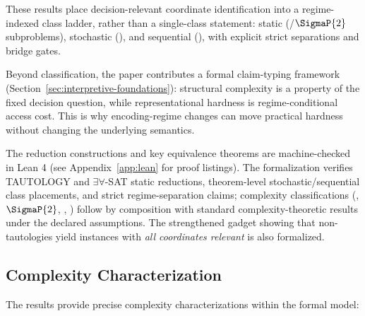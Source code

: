 These results place decision-relevant coordinate identification into a regime-indexed class ladder, rather than a single-class statement: static (\coNP/\(\SigmaP{2}\) subproblems), stochastic (\PP), and sequential (\PSPACE), with explicit strict separations and bridge gates.

Beyond classification, the paper contributes a formal claim-typing framework (Section~\ref{sec:interpretive-foundations}): structural complexity is a property of the fixed decision question, while representational hardness is regime-conditional access cost. This is why encoding-regime changes can move practical hardness without changing the underlying semantics.

The reduction constructions and key equivalence theorems are machine-checked in Lean 4 (see Appendix~\ref{app:lean} for proof listings). The formalization verifies TAUTOLOGY and \(\exists\forall\)-SAT static reductions, theorem-level stochastic/sequential class placements, and strict regime-separation claims; complexity classifications (\coNP, \(\SigmaP{2}\), \PP, \PSPACE) follow by composition with standard complexity-theoretic results under the declared assumptions. The strengthened gadget showing that non-tautologies yield instances with \emph{all coordinates relevant} is also formalized.

\subsection*{Complexity Characterization}

The results provide precise complexity characterizations within the formal model:

